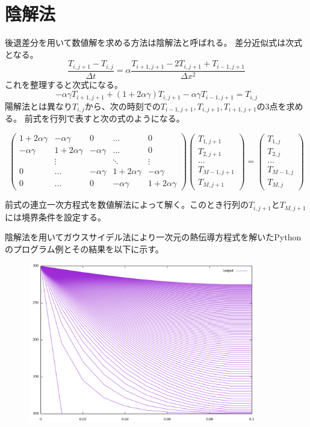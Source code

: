 \documentclass{ujarticle}
\begin{document}
\section{陰解法}
後退差分を用いて数値解を求める方法は陰解法と呼ばれる。
差分近似式は次式となる。
\begin{equation}
\frac{T_{i,j+1}-T_{i,j}}{\Delta t} = \alpha \frac{T_{i+1,j+1}-2T_{i,j+1}+T_{i-1,j+1}}{\Delta x^2}
\end{equation}
これを整理すると次式になる。
\begin{equation}
-\alpha \gamma T_{i+1,j+1}+(1+2 \alpha \gamma)T_{i,j+1} - \alpha \gamma T_{i-1,j+1} = T_{i,j}
\end{equation}
陽解法とは異なり$T_{i,j}$から、次の時刻での$T_{i-1,j+1},T_{i,j+1},T_{i+1,j+1}$の3点を求める。
前式を行列で表すと次の式のようになる。

\[
  \left(
    \begin{array}{ccccc}
      1+2 \alpha \gamma & -\alpha \gamma  & 0 & \ldots & 0 \\
      -\alpha \gamma  & 1+2 \alpha \gamma & -\alpha \gamma & \ldots & 0 \\
       & \vdots &  & \ddots & \vdots \\
      0 & \ldots & -\alpha \gamma  & 1+2 \alpha \gamma & -\alpha \gamma \\
      0 & \ldots & 0 &  -\alpha \gamma  & 1+2 \alpha \gamma
    \end{array}
  \right)
  \left(
  	\begin{array}{c}
  		T_{1,j+1} \\ T_{2,j+1} \\ \ldots \\ T_{M-1,j+1} \\ T_{M,j+1} 
  	\end{array}
  \right)
  =
  \left(
  	\begin{array}{c}
 		T_{1,j} \\ T_{2,j} \\ \ldots \\ T_{M-1,j} \\ T_{M,j} 
  	\end{array}
  \right)
\]

前式の連立一次方程式を数値解法によって解く。このとき行列の$T_{i,j+1}$と$T_{M,j+1}$には境界条件を設定する。

陰解法を用いてガウスサイデル法により一次元の熱伝導方程式を解いたPythonのプログラム例とその結果を以下に示す。
\begin{figure}[h]
	\begin{center}
		\includegraphics[width=100mm]{heat.png}
	\end{center}
\end{figure}
\end{document}
